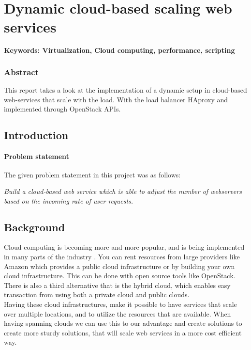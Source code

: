 \chapter{Dynamic cloud-based scaling web services}
\textbf{Keywords: Virtualization, Cloud computing, performance, scripting}

\subsection*{Abstract}

This report takes a look at the implementation of a dynamic setup in cloud-based
web-services that scale with the load. With the load balancer HAproxy and
implemented through OpenStack APIs.

\section{Introduction}

\subsubsection{Problem statement}

The given problem statement in this project was as follows:

\emph{Build a cloud-based web service which is able to adjust the number of
webservers based on the incoming rate of user requests.}

\section{Background}
Cloud computing is becoming more and more popular, and is being implemented
in many parts of the industry \cite{OpenStack:Users}. You can rent resources 
from large providers like Amazon which provides a public cloud infrastructure 
or by building your own cloud infrastructure. This can be done with open source 
tools like OpenStack. There is also a third alternative that is the hybrid cloud,
which enables easy transaction from using both a private cloud and public clouds.\\

Having these cloud infrastructures, make it possible to have services
that scale over multiple locations, and to utilize the resources that are
available. When having spanning clouds we can use this to our advantage 
and create solutions to create more sturdy solutions, that will scale web
services in a more cost efficient way.\\

